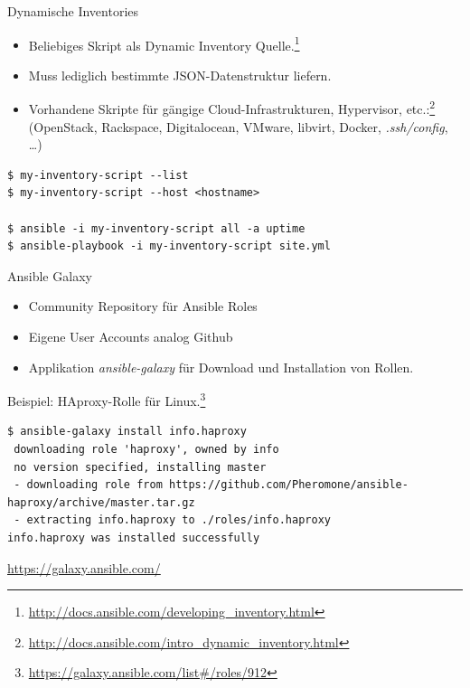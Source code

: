 \begin{frame}[fragile]{Dynamische Inventories}
  \begin{itemize}
    \item Beliebiges Skript als Dynamic Inventory
    Quelle.\footnote{\url{http://docs.ansible.com/developing_inventory.html}}
    \item Muss lediglich bestimmte JSON-Datenstruktur liefern.
    \item Vorhandene Skripte für gängige Cloud-Infrastrukturen,
    Hypervisor,
    etc.:\footnote{\url{http://docs.ansible.com/intro_dynamic_inventory.html}}
    \\[1ex]

    (OpenStack, Rackspace, Digitalocean, VMware, libvirt, Docker,
    \emph{.ssh/config}, \dots)
  \end{itemize}

  \begin{lstlisting}
$ my-inventory-script --list
$ my-inventory-script --host <hostname>

$ ansible -i my-inventory-script all -a uptime
$ ansible-playbook -i my-inventory-script site.yml
  \end{lstlisting}
\end{frame}




\begin{frame}[fragile]{Ansible Galaxy}
  \begin{itemize}
    \item Community Repository für Ansible Roles

    \item Eigene User Accounts analog Github

    \item Applikation \emph{ansible-galaxy} für Download und
    Installation von Rollen.
  \end{itemize}

  {\footnotesize Beispiel: HAproxy-Rolle für
  Linux.\footnote{\url{https://galaxy.ansible.com/list\#/roles/912}}}

  \begin{lstlisting}[basicstyle=\tiny\ttfamily]
$ ansible-galaxy install info.haproxy
 downloading role 'haproxy', owned by info
 no version specified, installing master
 - downloading role from https://github.com/Pheromone/ansible-haproxy/archive/master.tar.gz
 - extracting info.haproxy to ./roles/info.haproxy
info.haproxy was installed successfully
  \end{lstlisting}
  \vspace{\baselineskip}
  \centerline{\url{https://galaxy.ansible.com/}}


\end{frame}


